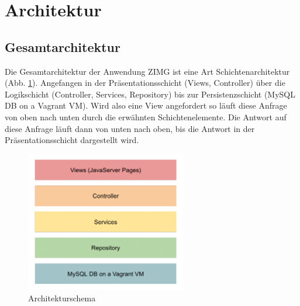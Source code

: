 \documentclass[12pt, oneside, a4paper]{article}		%
\begin{document}
\section{Architektur}

\subsection{Gesamtarchitektur}

Die Gesamtarchitektur der Anwendung ZIMG ist eine Art Schichtenarchitektur (Abb. \ref{ArchitectureScheme}). Angefangen in der Präsentationsschicht (Views, Controller) über die Logikschicht (Controller, Services, Repository) bis zur Persistenzschicht (MySQL DB on a Vagrant VM). Wird also eine View angefordert so läuft diese Anfrage von oben nach unten durch die erwähnten Schichtenelemente. Die Antwort auf diese Anfrage läuft dann von unten nach oben, bis die Antwort in der Präsentationsschicht dargestellt wird.

\begin{figure}[H]
	\centering
	\includegraphics[width=7cm]{footage/ZIMG_ProjektArchitektur} 
	\caption{Architekturschema}
	\label{ArchitectureScheme}
\end{figure}
\end{document}
